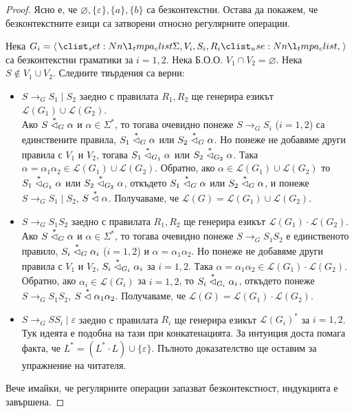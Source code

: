 \begin{proof}
    Ясно е, че $\varnothing, \{ \varepsilon \}, \{ a \}, \{ b \}$ са безконтекстни.
    Остава да покажем, че безконтекстните езици са затворени относно регулярните операции.

    Нека $G_i = \opair{\Sigma, V_i, S_i, R_i}$ са безконтекстни граматики за $i = 1, 2$.
    Нека Б.О.О. $V_1 \cap V_2 = \varnothing$.
    Нека $S \notin V_1 \cup V_2$.
    Следните твърдения са верни:
    \begin{itemize}
        \item $S \rightarrow_G S_1 \mid S_2$ заедно с правилата $R_1, R_2$ ще генерира езикът $\mathcal{L}(G_1) \cup \mathcal{L}(G_2)$. \\
              Ако $S \stackrel{*}{\vartriangleleft}_G \alpha$ и $\alpha \in \Sigma^*$, то тогава очевидно понеже $S \rightarrow_G S_i$ ($i = 1, 2$) са единствените правила, $S_1 \stackrel{*}{\vartriangleleft}_G \alpha$ или $S_2 \stackrel{*}{\vartriangleleft}_G \alpha$.
              Но понеже не добавяме други правила с $V_1$ и $V_2$, тогава $S_1 \stackrel{*}{\vartriangleleft}_{G_1} \alpha$ или $S_2 \stackrel{*}{\vartriangleleft}_{G_2} \alpha$.
              Така $\alpha = \alpha_1 \alpha_2 \in \mathcal{L}(G_1) \cup \mathcal{L}(G_2)$.
              Обратно, ако $\alpha \in \mathcal{L}(G_1) \cup \mathcal{L}(G_2)$ то $S_1 \stackrel{*}{\vartriangleleft}_{G_1} \alpha$ или $S_2 \stackrel{*}{\vartriangleleft}_{G_2} \alpha$, откъдето $S_1 \stackrel{*}{\vartriangleleft}_G \alpha$ или $S_2 \stackrel{*}{\vartriangleleft}_G \alpha$, и понеже $S \rightarrow_G S_1 \mid S_2$, $S \stackrel{*}{\vartriangleleft} \alpha$.
              Получаваме, че $\mathcal{L}(G) = \mathcal{L}(G_1) \cup \mathcal{L}(G_2)$.
        \item $S \rightarrow_G S_1 S_2$ заедно с правилата $R_1, R_2$ ще генерира езикът $\mathcal{L}(G_1) \cdot \mathcal{L}(G_2)$. \\
              Ако $S \stackrel{*}{\vartriangleleft}_G \alpha$ и $\alpha \in \Sigma^*$, то тогава очевидно понеже $S \rightarrow_G S_1 S_2$ е единственото правило, $S_i \stackrel{*}{\vartriangleleft}_G \alpha_i$ ($i = 1, 2$) и $\alpha = \alpha_1 \alpha_2$.
              Но понеже не добавяме други правила с $V_1$ и $V_2$, $S_i \stackrel{*}{\vartriangleleft}_{G_i} \alpha_i$ за $i = 1, 2$.
              Така $\alpha = \alpha_1 \alpha_2 \in \mathcal{L}(G_1) \cdot \mathcal{L}(G_2)$.
              Обратно, ако $\alpha_i \in \mathcal{L}(G_i)$ за $i = 1, 2$, то $S_i \stackrel{*}{\vartriangleleft}_{G_i} \alpha_i$, откъдето понеже $S \rightarrow_G S_1 S_2$, $S \stackrel{*}{\vartriangleleft} \alpha_1 \alpha_2$.
              Получаваме, че $\mathcal{L}(G) = \mathcal{L}(G_1) \cdot \mathcal{L}(G_2)$.
        \item $S \rightarrow_G S S_i \mid \varepsilon$ заедно с правилата $R_i$ ще генерира езикът $\mathcal{L}(G_i)^*$ за $i = 1, 2$. \\
              Тук идеята е подобна на тази при конкатенацията.
              За интуиция доста помага факта, че $L^* = (L^* \cdot L) \cup \{ \varepsilon \}$.
              Пълното доказателство ще оставим за упражнение на читателя.
    \end{itemize}

    Вече имайки, че регулярните операции запазват безконтекстност, индукцията е завършена.
\end{proof}

